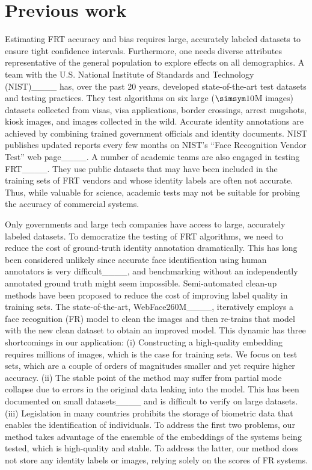 \section{Previous work}
\label{sec:previous-work}

Estimating FRT accuracy and bias requires large, accurately labeled datasets to ensure tight confidence intervals. Furthermore, one needs diverse attributes representative of the general population to explore effects on all demographics.  A team with the U.S. National Institute of Standards and Technology (NIST)____ has, over the past 20 years, developed state-of-the-art test datasets and testing practices. They test algorithms on six large ($\simsym 10$M images) datasets collected from visas, visa applications, border crossings, arrest mugshots, kiosk images, and images collected in the wild. Accurate identity annotations are achieved by combining trained government officials and identity documents. NIST publishes updated reports every few months on  NIST's  ``Face Recognition Vendor Test'' web page____. A number of academic teams are also engaged in testing FRT____. They use public datasets that may have been included in the training sets of FRT vendors and whose identity labels are often not accurate. Thus, while valuable for science, academic tests may not be suitable for probing the accuracy of commercial systems.

Only governments and large tech companies have access to large, accurately labeled datasets. 
To democratize the testing of FRT algorithms, we need to reduce the cost of ground-truth identity annotation dramatically.
This has long been considered unlikely since accurate face identification using human annotators is very difficult____, and benchmarking without an independently annotated ground truth might seem impossible. Semi-automated clean-up methods have been proposed to reduce the cost of improving label quality in training sets. The state-of-the-art, WebFace260M____, iteratively employs a face recognition (FR) model to clean the images and then re-trains that model with the new clean dataset to obtain an improved model. This dynamic has three shortcomings in our application: (i) Constructing a high-quality embedding requires millions of images, which is the case for training sets. We focus on test sets, which are a couple of orders of magnitudes smaller and yet require higher accuracy. (ii) The stable point of the method may suffer from partial mode collapse due to errors in the original data leaking into the model. This has been documented on small datasets____ and is difficult to verify on large datasets. (iii) Legislation in many countries prohibits the storage of biometric data that enables the identification of individuals. To address the first two problems, our method takes advantage of the ensemble of the embeddings of the systems being tested, which is high-quality and stable. To address the latter, our method does not store any identity labels or images, relying solely on the scores of FR systems.

